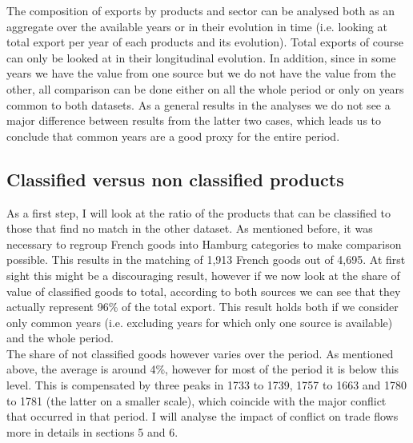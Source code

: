 \documentclass[12pt,a4paper,titlepage,english]{article}
\begin{document}
The composition of exports by products and sector can be analysed both as an aggregate over the available years or in their evolution in time (i.e. looking at total export per year of each products and its evolution). Total exports of course can only be looked at in their longitudinal evolution. In addition, since in some years we have the value from one source but we do not have the value from the other, all comparison can be done either on all the whole period or only on years common to both datasets. As a general results in the analyses we do not see a major difference between results from the latter two cases, which leads us to conclude that common years are a good proxy for the entire period. 

\subsection{Classified versus non classified products}
As a first step, I will look at the ratio of the products that can be classified to those that find no match in the other dataset. As mentioned before, it was necessary to regroup French goods into Hamburg categories to make comparison possible. This results in the matching of 1,913 French goods out of 4,695. At first sight this might be a discouraging result, however if we now look at the share of value of classified goods to total, according to both sources we can see that they actually represent 96\% of the total export. This result holds both if we consider only common years (i.e. excluding years for which only one source is available) and the whole period. \\
The share of not classified goods however varies over the period. As mentioned above, the average is around 4\%, however for most of the period it is below this level. This is compensated by three peaks in 1733 to 1739, 1757 to 1663 and 1780 to 1781 (the latter on a smaller scale), which coincide with the major conflict that occurred in that period. I will analyse the impact of conflict on trade flows more in details in sections 5 and 6.
\end{document}
